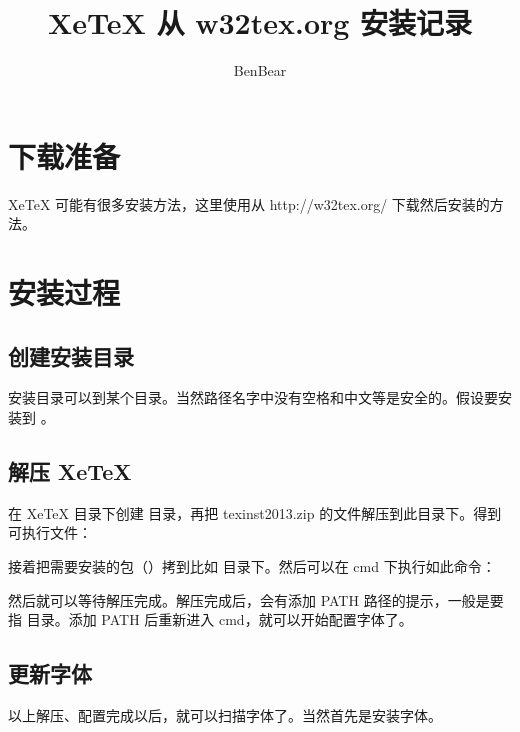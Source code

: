 \documentclass{article}
\title{XeTeX 从 w32tex.org 安装记录}
\author{BenBear}
\begin{document}
\maketitle

\section{下载准备}

XeTeX 可能有很多安装方法，这里使用从 http://w32tex.org/ 下载然后安装的方法。\par

\section{安装过程}
\subsection{创建安装目录}
安装目录可以到某个目录。当然路径名字中没有空格和中文等是安全的。假设要安装到  。\par

\subsection{解压 XeTeX}
在 XeTeX 目录下创建  目录，再把 texinst2013.zip 的文件解压到此目录下。得到可执行文件：\\
\par
接着把需要安装的包（）拷到比如  目录下。然后可以在 cmd 下执行如此命令：\\
\par
然后就可以等待解压完成。解压完成后，会有添加 PATH 路径的提示，一般是要指  目录。添加 PATH 后重新进入 cmd，就可以开始配置字体了。\par

\subsection{更新字体}
以上解压、配置完成以后，就可以扫描字体了。当然首先是安装字体。\par
\end{document}
